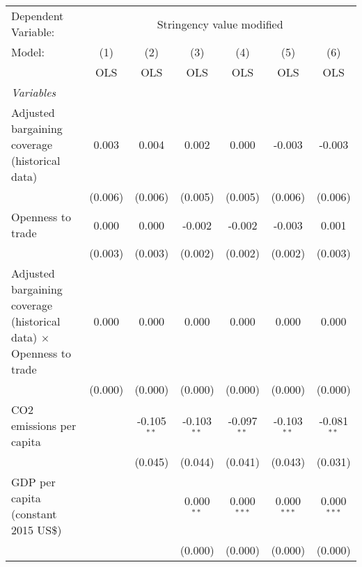
\begingroup
\centering
\begin{tabular}{lcccccc}
   \toprule
   Dependent Variable: & \multicolumn{6}{c}{Stringency value modified}\\
   Model:                                                                     & (1)     & (2)           & (3)           & (4)           & (5)           & (6)\\  
                                                                              &  OLS    & OLS           & OLS           & OLS           & OLS           & OLS\\  
   \midrule
   \emph{Variables}\\
   Adjusted bargaining coverage (historical data)                             & 0.003   & 0.004         & 0.002         & 0.000         & -0.003        & -0.003\\   
                                                                              & (0.006) & (0.006)       & (0.005)       & (0.005)       & (0.006)       & (0.006)\\   
   Openness to trade                                                          & 0.000   & 0.000         & -0.002        & -0.002        & -0.003        & 0.001\\   
                                                                              & (0.003) & (0.003)       & (0.002)       & (0.002)       & (0.002)       & (0.003)\\   
   Adjusted bargaining coverage (historical data) $\times$ Openness to trade  & 0.000   & 0.000         & 0.000         & 0.000         & 0.000         & 0.000\\   
                                                                              & (0.000) & (0.000)       & (0.000)       & (0.000)       & (0.000)       & (0.000)\\   
   CO2 emissions per capita                                                   &         & -0.105$^{**}$ & -0.103$^{**}$ & -0.097$^{**}$ & -0.103$^{**}$ & -0.081$^{**}$\\   
                                                                              &         & (0.045)       & (0.044)       & (0.041)       & (0.043)       & (0.031)\\   
   GDP per capita (constant 2015 US\$)                                        &         &               & 0.000$^{**}$  & 0.000$^{***}$ & 0.000$^{***}$ & 0.000$^{***}$\\   
                                                                              &         &               & (0.000)       & (0.000)       & (0.000)       & (0.000)\\   

\end{tabular}
